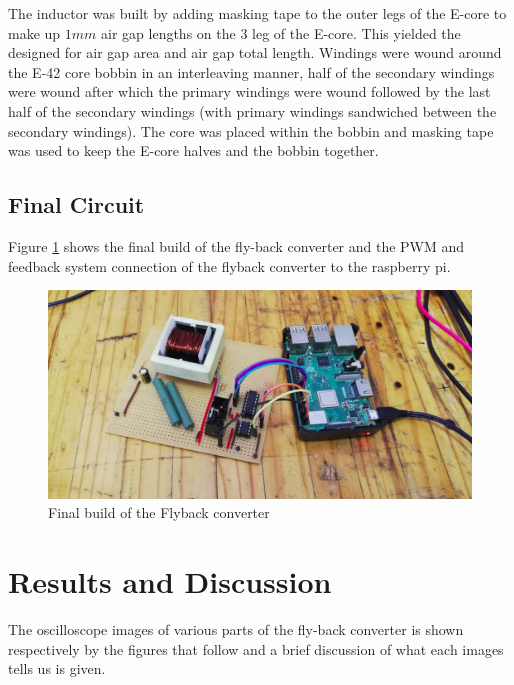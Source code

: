 \documentclass[a4paper, 12pt]{article}
\begin{document}
\noindent
The inductor was built by adding masking tape to the outer legs of the E-core
to make up $1mm$ air gap lengths on the $3$ leg of the E-core. This yielded the
designed for air gap area and air gap total length. Windings were wound around
the  E-42 core bobbin in an interleaving manner, half of the secondary windings
were wound after which the primary windings were wound followed by the last
half of the secondary windings (with  primary windings sandwiched between the
secondary windings). The core was placed within the bobbin and masking tape was
used to keep the E-core halves and the bobbin together. 



\subsection{Final Circuit}
Figure \ref{fig:flyback_converter_build} shows the final build of the fly-back
converter and the PWM and feedback system connection of the flyback converter
to the raspberry pi.
\begin{figure}[H]
  \centering
  \includegraphics[width=\textwidth]{images/final_circuit_image.png}
  \caption{Final build of the Flyback converter}
  \label{fig:flyback_converter_build}
\end{figure}


\section{Results and Discussion}
The oscilloscope images of various parts of the fly-back converter is shown
respectively by the figures that follow and a brief discussion of what each
images tells us is given.
\end{document}
